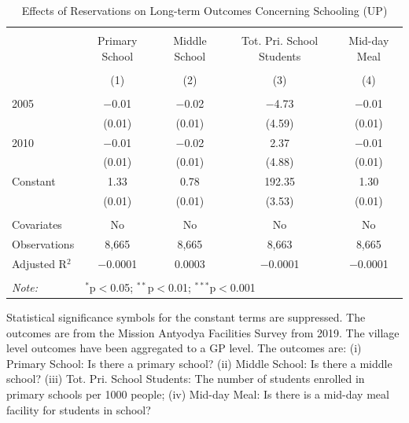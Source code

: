 \begin{table}[!htbp]
\centering
\begin{threeparttable}

  \caption{Effects of Reservations on Long-term Outcomes Concerning Schooling (UP)} 
  \label{up_shrug_schooling_05_10} 
\scriptsize 
\begin{tabular}{@{\extracolsep{0pt}}lcccc} 
\\[-1.8ex]\hline 
\hline \\[-1.8ex] 
 & Primary School & Middle School & Tot. Pri. School Students & Mid-day Meal \\ 
\\[-1.8ex] & (1) & (2) & (3) & (4)\\ 
\hline \\[-1.8ex] 
 2005 & $-$0.01 & $-$0.02 & $-$4.73 & $-$0.01 \\ 
  & (0.01) & (0.01) & (4.59) & (0.01) \\ 
  2010 & $-$0.01 & $-$0.02 & 2.37 & $-$0.01 \\ 
  & (0.01) & (0.01) & (4.88) & (0.01) \\ 
  Constant & 1.33 & 0.78 & 192.35 & 1.30 \\ 
  & (0.01) & (0.01) & (3.53) & (0.01) \\ 
 \hline \\[-1.8ex] 
Covariates & No & No & No & No \\ 
Observations & 8,665 & 8,665 & 8,663 & 8,665 \\ 
Adjusted R$^{2}$ & $-$0.0001 & 0.0003 & $-$0.0001 & $-$0.0001 \\ 
\hline 
\hline \\[-1.8ex] 
\textit{Note:}  & \multicolumn{4}{l}{$^{*}$p$<$0.05; $^{**}$p$<$0.01; $^{***}$p$<$0.001} \\ 
\end{tabular} 
\begin{tablenotes}[flushleft]
\scriptsize
\item[] Statistical significance symbols for the constant terms are suppressed. The outcomes are from the Mission Antyodya Facilities Survey from 2019.
                     The village level outcomes have been aggregated to a GP level.
                     The outcomes are:
                         (i) Primary School: Is there a primary school?
                         (ii) Middle School: Is there a middle school?
                         (iii) Tot. Pri. School Students: The number of students enrolled in primary schools per 1000 people;
                         (iv) Mid-day Meal: Is there is a mid-day meal facility for students in school?
\end{tablenotes}
\end{threeparttable}
\end{table}
